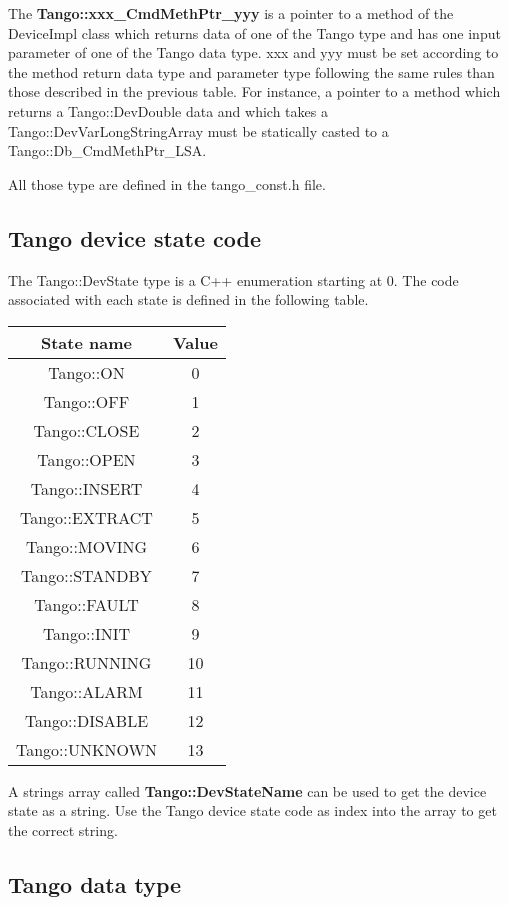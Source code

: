 The \textbf{Tango::xxx\_CmdMethPtr\_yyy} is a pointer to a method
of the DeviceImpl class which returns data of one of the Tango type
and has one input parameter of one of the Tango data type. xxx and
yyy must be set according to the method return data type and parameter
type following the same rules than those described in the previous
table. For instance, a pointer to a method which returns a Tango::DevDouble
data and which takes a Tango::DevVarLongStringArray must be statically
casted to a Tango::Db\_CmdMethPtr\_LSA.

All those type are defined in the tango\_const.h file.


\subsection{Tango device state code}

The Tango::DevState type is a C++ enumeration starting at 0. The code
associated with each state is defined in the following
table.

\vspace{0.3cm}


\begin{center}
\begin{longtable}{|c|c|}
\hline 
State name & Value\tabularnewline
\hline 
\hline 
Tango::ON & 0\tabularnewline
\hline 
Tango::OFF & 1\tabularnewline
\hline 
Tango::CLOSE & 2\tabularnewline
\hline 
Tango::OPEN & 3\tabularnewline
\hline 
Tango::INSERT & 4\tabularnewline
\hline 
Tango::EXTRACT & 5\tabularnewline
\hline 
Tango::MOVING & 6\tabularnewline
\hline 
Tango::STANDBY & 7\tabularnewline
\hline 
Tango::FAULT & 8\tabularnewline
\hline 
Tango::INIT & 9\tabularnewline
\hline 
Tango::RUNNING & 10\tabularnewline
\hline 
Tango::ALARM & 11\tabularnewline
\hline 
Tango::DISABLE & 12\tabularnewline
\hline 
Tango::UNKNOWN & 13\tabularnewline
\hline 
\end{longtable}
\par\end{center}

\vspace{0.3cm}


A strings array called \textbf{Tango::DevStateName}
can be used to get the device state as a string. Use the Tango device
state code as index into the array to get the correct string.


\subsection{Tango data type }

